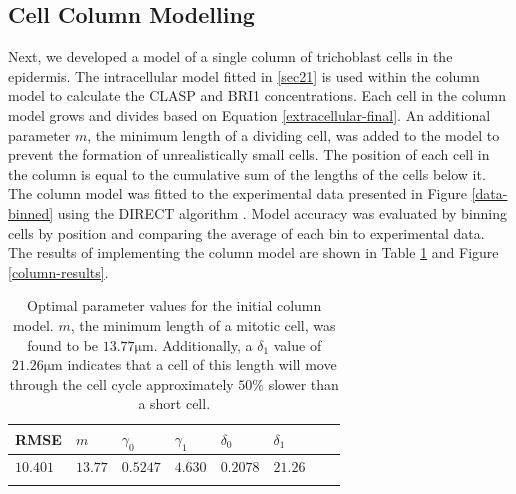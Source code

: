 \documentclass[referee,pdflatex,sn-mathphys-num]{sn-jnl}
\newcommand{\um}{\unit{\micro\metre}}
\begin{document}
\subsection{Cell Column Modelling}

Next, we developed a model of a single column of trichoblast cells in the epidermis.  The intracellular model fitted in \ref{sec21} is used within the column model to calculate the CLASP and BRI1 concentrations. Each cell in the column model grows and divides based on Equation \eqref{extracellular-final}. An additional parameter $m$, the minimum length of a dividing cell, was added to the model to prevent the formation of unrealistically small cells. The position of each cell in the column is equal to the cumulative sum of the lengths of the cells below it. The column model was fitted to the experimental data presented in Figure \ref{data-binned} using the DIRECT algorithm \cite{jones1993}. Model accuracy was evaluated by binning cells by position and comparing the average of each bin to experimental data. The results of implementing the column model are shown in Table \ref{column-fits} and Figure \ref{column-results}.

\begin{table}[ht]
\caption{Optimal parameter values for the initial column model. $m$, the minimum length of a mitotic cell, was found to be $13.77\um$. Additionally, a $\delta_{1}$ value of $21.26\um$ indicates that a cell of this length will move through the cell cycle approximately $50\%$ slower than a short cell. }
\label{column-fits}
\begin{tabular}{@{}llllllll@{}}
\toprule
RMSE & $m$ & $\gamma_{0}$ & $\gamma_{1}$ & $\delta_{0}$ & $\delta_{1}$ \\
\midrule
$10.401$ & $13.77$ & $0.5247$ & $4.630$ & $0.2078$ & $21.26$\\
\botrule
\end{tabular}
\end{table}
\end{document}
